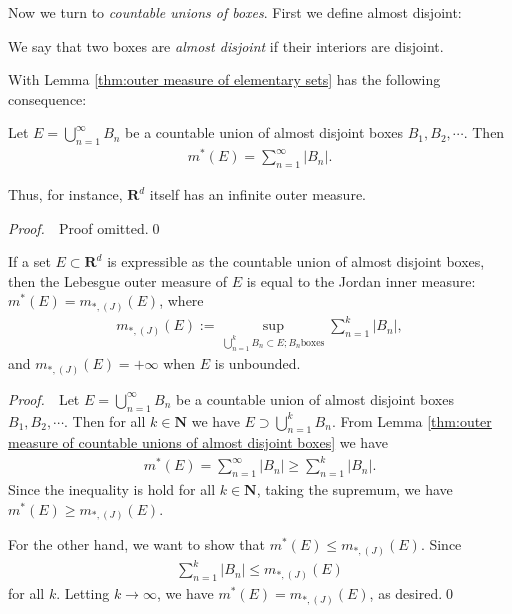 \documentclass{book}
\theoremstyle{defstyle}
\theoremstyle{thmstyle}
\newcommand{\JIM}{m_{*, (J)}}%
\newcommand{\pff}{\noindent\emph{Proof.}~~}
\newcommand{\newa}{\vspace{1em}\indent}
\begin{document}
\newa Now we turn to \emph{countable unions of boxes}. First we define almost disjoint:

\begin{definition}\label{def:almost disjoint}
    We say that two boxes are \emph{almost disjoint} if their interiors are disjoint.
\end{definition}

With Lemma \ref{thm:outer measure of elementary sets} has the following consequence:
\begin{lemma}\label{thm:outer measure of countable unions of almost disjoint boxes}
    Let $E = \bigcup_{n = 1}^{\infty}B_n$ be a countable union of almost disjoint boxes $B_1, B_2, \cdots$. Then
        \begin{align*}
            m^*(E) = \sum_{n = 1}^{\infty}|B_n|.
        \end{align*}
    
    Thus, for instance, $\mathbf{R}^d$ itself has an infinite outer measure.
\end{lemma}

\pff Proof omitted.\qed

\begin{lemma}
    If a set $E \subset \mathbf{R}^d$ is expressible as the countable union of almost disjoint boxes, then the Lebesgue outer measure of $E$ is equal to the Jordan inner measure: $m^*(E) = \JIM(E)$, where
        \begin{align*}
            \JIM(E) := \sup_{\bigcup_{n = 1}^{k}B_n \subset E; B_n \text{boxes}} \sum_{n = 1}^{k}|B_n|,
        \end{align*}
    and $\JIM(E) = +\infty$ when $E$ is unbounded.
\end{lemma}

\pff Let $E = \bigcup_{n = 1}^{\infty}B_n$ be a countable union of almost disjoint boxes $B_1, B_2, \cdots$. Then for all $k \in \mathbf{N}$ we have $E \supset \bigcup_{n = 1}^{k} B_n$. From Lemma \ref{thm:outer measure of countable unions of almost disjoint boxes} we have
    \begin{align}
        m^*(E) = \sum_{n = 1}^{\infty}|B_n| \geq \sum_{n = 1}^{k}|B_n|.
    \end{align}
Since the inequality is hold for all $k \in \mathbf{N}$, taking the supremum, we have $m^*(E) \geq \JIM(E)$.

For the other hand, we want to show that $m^*(E) \leq \JIM(E)$. Since
    \begin{align*}
        \sum_{n = 1}^{k}|B_n| \leq \JIM(E)
    \end{align*}
for all $k$. Letting $k \to \infty$, we have $m^*(E) = \JIM(E)$, as desired.\qed
\end{document}
